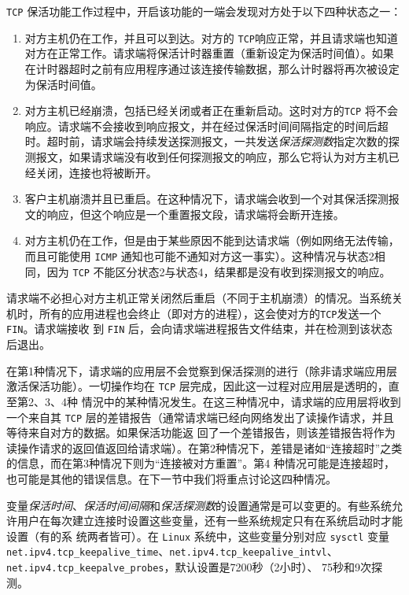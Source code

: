 \verb|TCP| 保活功能工作过程中，开启该功能的一端会发现对方处于以下四种状态之一：
\begin{enumerate}
    \item 对方主机仍在工作，并且可以到达。对方的 \verb|TCP|响应正常，并且请求端也知道对方在正常工作。请求端将保活计时器重置（重新设定为保活时间值）。如果在计时器超时之前有应用程序通过该连接传输数据，那么计时器将再次被设定为保活时间值。
    \item 对方主机已经崩溃，包括已经关闭或者正在重新启动。这时对方的\verb|TCP| 将不会响应。请求端不会接收到响应报文，并在经过保活时间间隔指定的时间后超时。超时前，请求端会持续发送探测报文，一共发送\emph{保活探测数}指定次数的探测报文，如果请求端没有收到任何探测报文的响应，那么它将认为对方主机已经关闭，连接也将被断开。
    \item 客户主机崩溃并且已重启。在这种情况下，请求端会收到一个对其保活探测报文的响应，但这个响应是一个重置报文段，请求端将会断开连接。
    \item 对方主机仍在工作，但是由于某些原因不能到达请求端（例如网络无法传输，而且可能使用 \verb|ICMP| 通知也可能不通知对方这一事实）。这种情况与状态2相同，因为 \verb|TCP| 不能区分状态2与状态4，结果都是没有收到探测报文的响应。
\end{enumerate}

请求端不必担心对方主机正常关闭然后重启（不同于主机崩溃）的情况。当系统关机时，所有的应用进程也会终止（即对方的进程），这会使对方的\verb|TCP|发送一个 \verb|FIN|。请求端接收
到 \verb|FIN| 后，会向请求端进程报告文件结束，并在检测到该状态后退出。

在第1种情况下，请求端的应用层不会觉察到保活探测的进行（除非请求端应用层激活保活功能）。一切操作均在 \verb|TCP| 层完成，因此这一过程对应用层是透明的，直至第2、3、4种
情況中的某种情况发生。在这三种情况中，请求端的应用层将收到一个来自其 \verb|TCP| 层的差错报告（通常请求端已经向网络发出了读操作请求，并且等待来自对方的数据。如果保活功能返
回了一个差错报告，则该差错报告将作为读操作请求的返回值返回给请求端）。在第2种情况下，差错是诸如“连接超时”之类的信息，而在第3种情况下则为“连接被对方重置”。第4
种情况可能是连接超时，也可能是其他的错误信息。在下一节中我们将重点讨论这四种情况。

变量\emph{保活时间}、\emph{保活时间间隔}和\emph{保活探测数}的设置通常是可以变更的。有些系统允许用户在每次建立连接时设置这些变量，还有一些系统规定只有在系统启动时才能设置（有的系
统两者皆可）。在 \verb|Linux| 系统中，这些变量分别对应 \verb|sysctl| 变量 \verb|net.ipv4.tcp_keepalive_time|、\verb|net.ipv4.tcp_keepalive_intvl|、\verb|net.ipv4.tcp_keepalve_probes|，默认设置是7200秒（2小时）、
75秒和9次探测。


